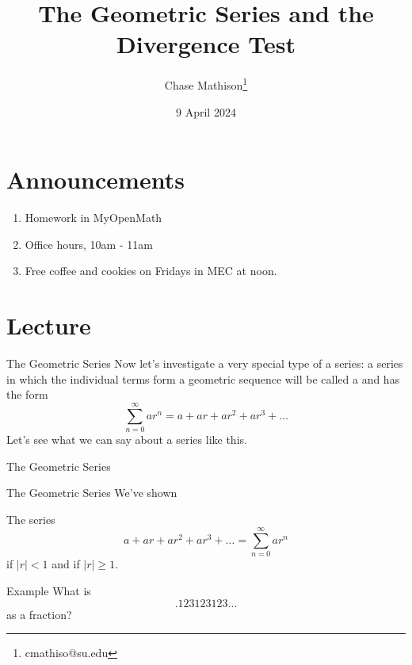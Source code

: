 \documentclass[presentation]{beamer}
\institute[SU]{Shenandoah University}
\author{Chase Mathison\thanks{cmathiso@su.edu}}
\date{9 April 2024}
\title{The Geometric Series and the Divergence Test}
\begin{document}
\maketitle

\section{Announcements}
\label{sec:org5da53c4}
\begin{enumerate}
\item Homework in MyOpenMath
\item Office hours, 10am - 11am
\item Free coffee and cookies on Fridays in MEC at noon.
\end{enumerate}

\section{Lecture}
\label{sec:orgc8a3afc}
\begin{frame}[label={sec:org43f779e}]{The Geometric Series}
Now let's investigate a very special type of a series: a series in which the individual terms
form a geometric sequence will be called a \uline{\hspace*{1in}} and has the form
\[
\sum\limits_{n=0}^{\infty} ar^n = a + ar + ar^2 + ar^3 + \ldots\]
Let's see what we can say about a series like this.

\vspace{10in}
\end{frame}

\begin{frame}[label={sec:orgf062e3f}]{The Geometric Series}
\end{frame}

\begin{frame}[label={sec:org6053274}]{The Geometric Series}
We've shown

\begin{theorem}
The series
\[
a + ar + ar^2 + ar^3 + \ldots = \sum\limits_{n=0}^{\infty} ar^n\]
\uline{\hspace*{2in}} if \(|r| < 1\) and \uline{\hspace*{1in}} if \(|r| \ge 1.\)
\end{theorem}
\end{frame}

\begin{frame}[label={sec:org0684c8f}]{Example}
What is
\[
.123123123\ldots\]
as a fraction?
\vspace{10in}
\end{frame}
\end{document}
